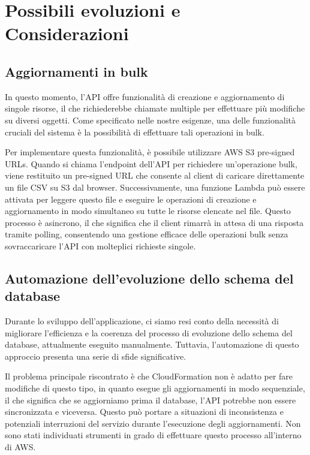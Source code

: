 \chapter{Possibili evoluzioni e Considerazioni}

\section{Aggiornamenti in bulk}
In questo momento, l'API offre funzionalità di creazione e aggiornamento di singole risorse, il che richiederebbe chiamate multiple per effettuare più modifiche su diversi oggetti. Come specificato nelle nostre esigenze, una delle funzionalità cruciali del sistema è la possibilità di effettuare tali operazioni in bulk.

Per implementare questa funzionalità, è possibile utilizzare AWS S3 pre-signed URLs. Quando si chiama l'endpoint dell'API per richiedere un'operazione bulk, viene restituito un pre-signed URL che consente al client di caricare direttamente un file CSV su S3 dal browser. Successivamente, una funzione Lambda può essere attivata per leggere questo file e eseguire le operazioni di creazione e aggiornamento in modo simultaneo su tutte le risorse elencate nel file. Questo processo è asincrono, il che significa che il client rimarrà in attesa di una risposta tramite polling, consentendo una gestione efficace delle operazioni bulk senza sovraccaricare l'API con molteplici richieste singole.

\section{Automazione dell'evoluzione dello schema del database}
\label{evoluzione_db_problematica}
Durante lo sviluppo dell'applicazione, ci siamo resi conto della necessità di migliorare l'efficienza e la coerenza del processo di evoluzione dello schema del database, attualmente eseguito manualmente. Tuttavia, l'automazione di questo approccio presenta una serie di sfide significative.

Il problema principale riscontrato è che CloudFormation non è adatto per fare modifiche di questo tipo, in quanto esegue gli aggiornamenti in modo sequenziale, il che significa che se aggiorniamo prima il database, l'API potrebbe non essere sincronizzata e viceversa. Questo può portare a situazioni di inconsistenza e potenziali interruzioni del servizio durante l'esecuzione degli aggiornamenti. Non sono stati individuati strumenti in grado di effettuare questo processo all'interno di AWS.

